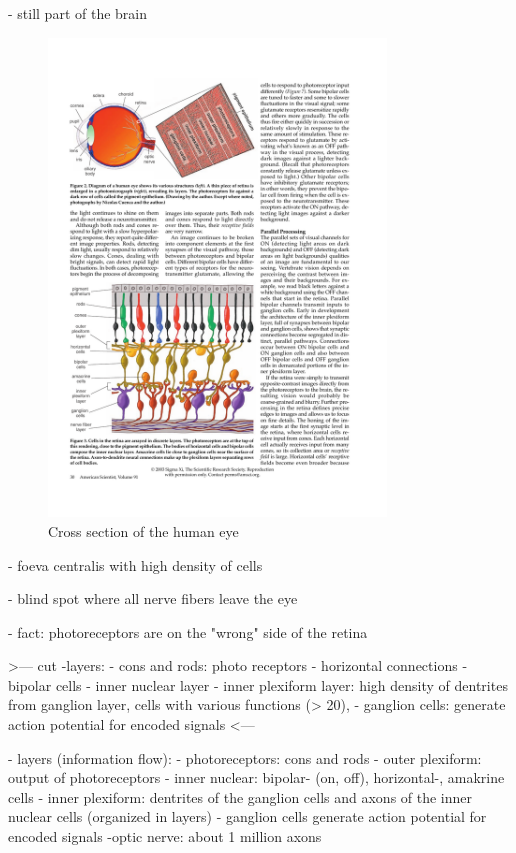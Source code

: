 		- still part of the brain
		
		\begin{figure}[H]
			\centering
			\includegraphics[width=0.8\textwidth, trim=1cm 21cm 8cm 2.5cm, clip]{images/kolb-2003-howtheretinaworks-p3.pdf}
			\caption{Cross section of the human eye \citep{kolb2003retina}}
		\end{figure}

		- foeva centralis with high density of cells
		
		- blind spot where all nerve fibers leave the eye

		- fact: photoreceptors are on the "wrong" side of the retina

>--- cut
		-layers:
			- cons and rods: photo receptors
			- horizontal connections
			- bipolar cells
			- inner nuclear layer
			- inner plexiform layer: high density of dentrites from ganglion layer, cells with various functions (> 20), 
			- ganglion cells: generate action potential for encoded signals
<---
		
		- layers (information flow):
			- photoreceptors: cons and rods
			- outer plexiform: output of photoreceptors
			- inner nuclear: bipolar- (on, off), horizontal-, amakrine cells
			- inner plexiform: dentrites of the ganglion cells and axons of the inner nuclear cells (organized in layers)
			- ganglion cells generate action potential for encoded signals
			-optic nerve: about 1 million axons
		
